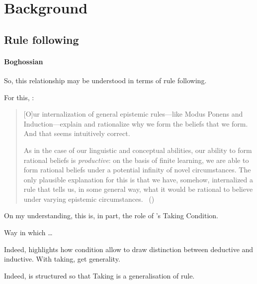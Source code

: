 \section{Background}
\label{sec:background}

\subsection{Rule following}

\paragraph{Boghossian}

\begin{note}
  So, this relationship may be understood in terms of rule following.

  For this, \citeauthor{Boghossian:2008vf}:

  \begin{quote}
    [O]ur internalization of general epistemic rules---like Modus Ponens and Induction---explain and rationalize why we form the beliefs that we form.
    And that seems intuitively correct.

    As in the case of our linguistic and conceptual abilities, our ability to form rational beliefs is \emph{productive}: on the basis of finite learning, we are able to form rational beliefs under a potential infinity of novel circumstances.
    The only plausible explanation for this is that we have, somehow, internalized a rule that tells us, in some general way, what it would be rational to believe under varying epistemic circumstances.%
    \mbox{ }\hfill\mbox{(\citeyear[483]{Boghossian:2008vf})}
  \end{quote}
\end{note}

\begin{note}
  On my understanding, this is, in part, the role of \citeauthor{Boghossian:2014aa}'s Taking Condition.

  Way in which \dots

  Indeed, \citeauthor{Boghossian:2014aa} highlights how condition allow to draw distinction between deductive and inductive.
  With taking, get generality.

  Indeed, \textcite{Boghossian:2014aa} is structured so that Taking is a generalisation of rule.
\end{note}

